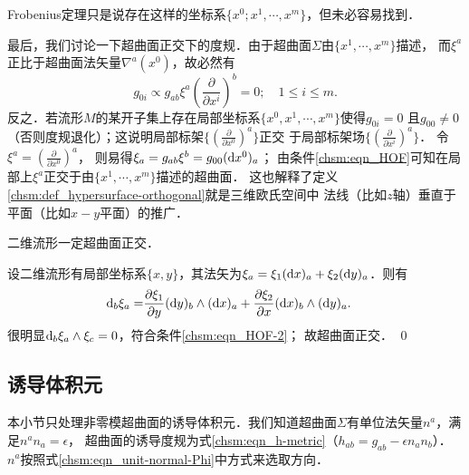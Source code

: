 Frobenius定理只是说存在这样的坐标系$\{x^0;x^1,\cdots,x^m\}$，但未必容易找到．

最后，我们讨论一下超曲面正交下的度规．由于超曲面$\Sigma$由$\{x^1,\cdots,x^m\}$描述，
而$\xi^a$正比于超曲面法矢量$\nabla^a(x^0)$，故必然有
\begin{equation}
    g_{0i}\propto g_{ab} \xi^a \left(\frac{\partial }{\partial x^i} \right)^b=0;
    \quad 1\leqslant i \leqslant m .
\end{equation}
反之．若流形$M$的某开子集上存在局部坐标系$\{x^0,x^1,\cdots,x^m\}$使得$g_{0i}=0$
且$g_{00}\neq 0$（否则度规退化）；这说明局部标架$\{(\frac{\partial }{\partial x^0} )^a\}$正交
于局部标架场$\{(\frac{\partial }{\partial x^i} )^a\}$．
令$\xi^a=(\frac{\partial }{\partial x^0} )^a$，
则易得$\xi_a= g_{ab}\xi^b = g_{00}({\rm d}x^0)_a$；
由条件\eqref{chsm:eqn_HOF}可知在局部上$\xi^a$正交于由$\{x^1,\cdots,x^m\}$描述的超曲面．
这也解释了定义\ref{chsm:def_hypersurface-orthogonal}就是三维欧氏空间中
法线（比如$z$轴）垂直于平面（比如$x-y$平面）的推广．

\begin{example}
	二维流形一定超曲面正交．
\end{example}

设二维流形有局部坐标系$\{x,y\}$，其法矢为$\xi_a=\xi_1 ({\rm d}x)_a+\xi_2 ({\rm d}y)_a$．则有
\begin{align*}
	{\rm d}_b \xi_a = & \frac{\partial \xi_1}{\partial y} ({\rm d}y)_b\wedge ({\rm d}x)_a
	+\frac{\partial \xi_2}{\partial x} ({\rm d}x)_b\wedge ({\rm d}y)_a .
\end{align*}
很明显${\rm d}_b \xi_a \wedge \xi_c =0$，符合条件\eqref{chsm:eqn_HOF-2}；
故超曲面正交． \qed




\subsection{诱导体积元}\label{chsm:sec_induced-VE}
本小节只处理非零模超曲面的诱导体积元．我们知道超曲面$\Sigma$有单位法矢量$n^a$，满足$n^a n_a=\epsilon$，
超曲面的诱导度规为式\eqref{chsm:eqn_h-metric}（$h_{ab} {=} g_{ab} -\epsilon {n}_a {n}_b$）．
$n^a$按照式\eqref{chsm:eqn_unit-normal-Phi}中方式来选取方向．

